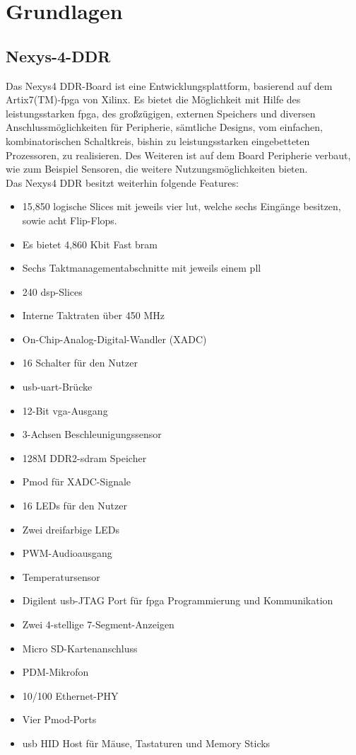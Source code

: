 \chapter{Grundlagen}\label{kap:grundlagen}


\section{Nexys-4-DDR}\label{kap:nexys4}
Das Nexys4 DDR-Board ist eine Entwicklungsplattform, basierend auf dem Artix7(TM)-\ac{fpga}
von Xilinx. Es bietet die Möglichkeit mit Hilfe des leistungsstarken \ac{fpga}, des großzügigen, externen Speichers und diversen Anschlussmöglichkeiten
für Peripherie, sämtliche Designs, vom einfachen, kombinatorischen Schaltkreis, bishin zu leistungsstarken eingebetteten Prozessoren, zu realisieren.
Des Weiteren ist auf dem Board Peripherie verbaut, wie zum Beispiel Sensoren, die weitere Nutzungsmöglichkeiten bieten.\\
Das Nexys4 DDR besitzt weiterhin folgende Features:~\cite{digilent}\\
\begin{itemize}
  \item 15,850 logische Slices mit jeweils vier \ac{lut}, welche sechs Eingänge besitzen, sowie acht Flip-Flops.
  \item Es bietet 4,860 Kbit Fast \ac{bram}
  \item Sechs Taktmanagementabschnitte mit jeweils einem \ac{pll}
  \item 240 \ac{dsp}-Slices
  \item Interne Taktraten über 450 MHz
  \item On-Chip-Analog-Digital-Wandler (XADC)
  \item 16 Schalter für den Nutzer
  \item \ac{usb}-\ac{uart}-Brücke
  \item 12-Bit \ac{vga}-Ausgang
  \item 3-Achsen Beschleunigungssensor
  \item 128M DDR2-\ac{sdram} Speicher
  \item Pmod für XADC-Signale
  \item 16 LEDs für den Nutzer
  \item Zwei dreifarbige LEDs
  \item PWM-Audioausgang
  \item Temperatursensor
  \item Digilent \ac{usb}-JTAG Port für \ac{fpga} Programmierung und Kommunikation
  \item Zwei 4-stellige 7-Segment-Anzeigen
  \item Micro SD-Kartenanschluss
  \item PDM-Mikrofon
  \item 10/100 Ethernet-PHY
  \item Vier Pmod-Ports
  \item \ac{usb} HID Host für Mäuse, Tastaturen und Memory Sticks
\end{itemize}




